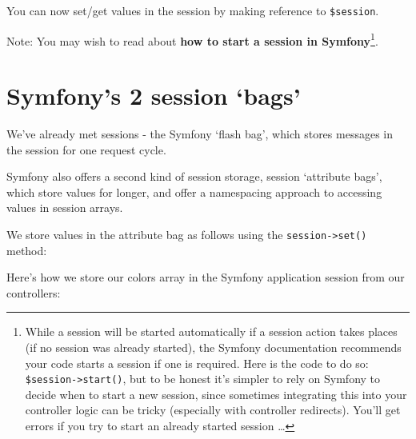 \documentclass[a4paperpaper,openright]{book}
\newenvironment{Shaded}{}{}
\newcommand{\CommentTok}[1]{\textcolor[rgb]{0.38,0.63,0.69}{\textit{#1}}}
\newcommand{\KeywordTok}[1]{\textcolor[rgb]{0.00,0.44,0.13}{\textbf{#1}}}
\newcommand{\NormalTok}[1]{#1}
\newcommand{\OtherTok}[1]{\textcolor[rgb]{0.00,0.44,0.13}{#1}}
\newcommand{\StringTok}[1]{\textcolor[rgb]{0.25,0.44,0.63}{#1}}
\begin{document}
You can now set/get values in the session by making reference to
\texttt{\$session}.

Note: You may wish to read about \textbf{how to start a session in
Symfony}\footnote{While a session will be started automatically if a
  session action takes places (if no session was already started), the
  Symfony documentation recommends your code starts a session if one is
  required. Here is the code to do so:
  \texttt{\$session-\textgreater{}start()}, but to be honest it's
  simpler to rely on Symfony to decide when to start a new session,
  since sometimes integrating this into your controller logic can be
  tricky (especially with controller redirects). You'll get errors if
  you try to start an already started session \ldots{}}.

\hypertarget{symfonys-2-session-bags}{%
\section{Symfony's 2 session `bags'}\label{symfonys-2-session-bags}}

We've already met sessions - the Symfony `flash bag', which stores
messages in the session for one request cycle.

Symfony also offers a second kind of session storage, session `attribute
bags', which store values for longer, and offer a namespacing approach
to accessing values in session arrays.

We store values in the attribute bag as follows using the
\texttt{session-\textgreater{}set()} method:

\begin{Shaded}
\end{Shaded}

Here's how we store our colors array in the Symfony application session
from our controllers:

\begin{Shaded}
\end{Shaded}
\end{document}
